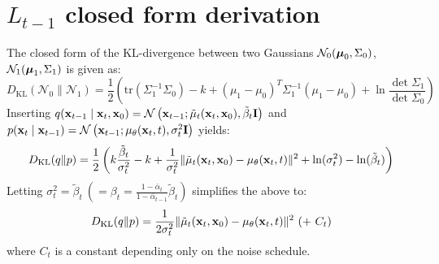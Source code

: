 \section{$L_{t-1}$ closed form derivation} \label{appendix:L-closed-form}
The closed form of the KL-divergence between two Gaussians $\mathcal{N}_0(\boldsymbol{\mathbf{\mu}}_0, \Sigma_0)$, $\mathcal{N}_1(\boldsymbol{\mathbf{\mu}}_1, \Sigma_1)$ is given as:
\begin{equation}
    D_\mathrm{KL}(\mathcal{N}_0 \| \mathcal{N}_1) = \frac{1}{2} \left(
        \mathrm{tr}(\Sigma_1^{-1} \Sigma_0) - k + (\mu_1 - \mu_0)^T \Sigma_1^{-1} (\mu_1 - \mu_0) + \ln \frac{\det \Sigma_1}{\det \Sigma_0}
    \right)
\end{equation}
Inserting $q(\boldsymbol{\mathbf{x}}_{t-1} \mid \boldsymbol{\mathbf{x}}_t, \boldsymbol{\mathbf{x}}_0) = \mathcal{N}\left(\boldsymbol{\mathbf{x}}_{t-1}; \tilde{\mu}_t(\boldsymbol{\mathbf{x}}_t, \boldsymbol{\mathbf{x}}_0), \tilde{\beta}_t \boldsymbol{\mathbf{I}}\right)$ and $p(\boldsymbol{\mathbf{x}}_t \mid \boldsymbol{\mathbf{x}}_{t-1}) = \mathcal{N}\left( \boldsymbol{\mathbf{x}}_{t-1} ; \mu_\theta(\boldsymbol{\mathbf{x}}_t, t), \sigma_t^2 \boldsymbol{\mathbf{I}} \right)$ yields:
\begin{equation}
    D_\mathrm{KL}(q \| p) = \frac{1}{2} \left(
        k\frac{\tilde{\beta}_t}{\sigma_t^2} - k + \frac{1}{\sigma_t^2} \| \tilde{\mu}_t(\boldsymbol{\mathbf{x}}_t, \boldsymbol{\mathbf{x}}_0) - \mu_\theta(\boldsymbol{\mathbf{x}}_t, t) \|^2 + \ln(\sigma_t^2) - \ln(\tilde{\beta}_t)
    \right)
\end{equation}
Letting $\sigma_t^2 = \tilde{\beta}_t \ (= \beta_t = \frac{ 1-\bar{\alpha}_t}{1-\bar{\alpha}_{t-1}} \tilde{\beta}_t)$ simplifies the above to:
\begin{equation}
    D_\mathrm{KL}(q \| p) = \frac{1}{2\sigma_t^2} \| \tilde{\mu}_t(\boldsymbol{\mathbf{x}}_t, \boldsymbol{\mathbf{x}}_0) - \mu_\theta(\boldsymbol{\mathbf{x}}_t, t) \|^2 \ (+ \ C_t)
\end{equation}
where $C_t$ is a constant depending only on the noise schedule.
